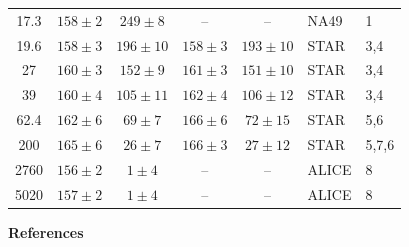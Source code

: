 \documentclass[10pt]{article}
\begin{document}
\begin{longtable}{c c c c c l l}
  17.3 & $158 \pm 2$ & $249 \pm 8$ & -- & -- & NA49 & 1 \\
  19.6 & $158 \pm 3$ & $196 \pm 10$ & $158 \pm 3$ & $193 \pm 10$ & STAR & 3,4 \\
  27 & $160 \pm 3$ & $152 \pm 9$ & $161 \pm 3$ & $151 \pm 10$ & STAR & 3,4 \\
  39 & $160 \pm 4$ & $105 \pm 11$ & $162 \pm 4$ & $106 \pm 12$ & STAR & 3,4 \\
  62.4 & $162 \pm 6$ & $69 \pm 7$ & $166 \pm 6$ & $72 \pm 15$ & STAR & 5,6 \\
  200 & $165 \pm 6$ & $26 \pm 7$ & $166 \pm 3$ & $27 \pm 12$ & STAR & 5,7,6 \\
  2760 & $156 \pm 2$ & $1 \pm 4$ & -- & -- & ALICE & 8 \\
  5020 & $157 \pm 2$ & $1 \pm 4$ & -- & -- & ALICE & 8 \\
\bottomrule
\end{longtable}

\clearpage
\normalsize
\textbf{References}
\end{document}
